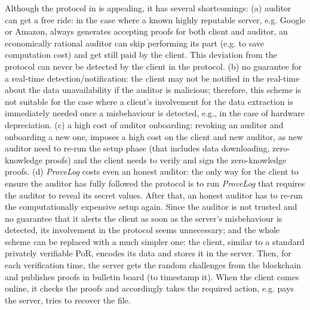 Although the protocol in  \cite{armknecht2014outsourced}  is appealing, it has  several shortcomings: (a) auditor can get a free ride: in the case where a known highly reputable  server, e.g. Google or Amazon, always generates   accepting proofs for both client and auditor, an economically rational auditor can skip performing its part (e.g. to save computation cost) and get still paid by the client. This deviation from the protocol can never be detected by the client in the protocol.  (b) no guarantee for a real-time detection/notification: the client may not be notified in the real-time about the data unavailability if the auditor is malicious; therefore, this scheme is not suitable for the case where a client's involvement for the data extraction is  immediately needed once a misbehaviour is detected, e.g., in the case of hardware depreciation. (c) a high cost of auditor onboarding:  revoking an auditor and onboarding a new one, imposes a high cost on the client and new auditor, as new auditor need to re-run the setup phase (that includes data downloading, zero-knowledge proofs) and the client needs to verify and sign the zero-knowledge proofs. (d) \textit{ProveLog} costs even an honest auditor: the only way for the client to ensure the auditor has fully followed the protocol is to run \textit{ProveLog} that requires the auditor to reveal its secret values. After that,  an honest auditor has to re-run the computationally expensive setup  again. Since the auditor is not trusted and no guarantee that it alerts the client as soon as the server's misbehaviour is detected, its involvement in the protocol seems unnecessary; and the whole scheme can be replaced with a much simpler one: the client, similar to a standard privately verifiable PoR, encodes its data and stores it in the server. Then, for each verification time, the server gets the random challenges from the blockchain and publishes  proofs in  bulletin board (to timestamp it). When the client comes online, it checks the proofs and accordingly takes the required action, e.g. pays the server, tries to recover the file.

